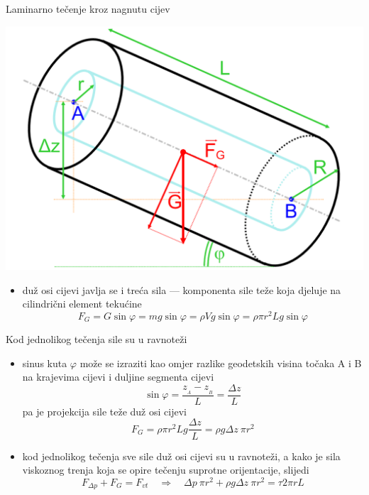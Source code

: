 \documentclass[croatian]{beamer}
\begin{document}
\begin{frame}{Laminarno tečenje kroz nagnutu cijev}

\begin{center}
\includegraphics[width=0.5\paperwidth]{slike/slika2.PNG}
\par\end{center}
\begin{itemize}
\item duž osi cijevi javlja se i treća sila --- komponenta sile teže koja
djeluje na cilindrični element tekućine
\[
F_{G}=G\sin\varphi=mg\sin\varphi=\rho Vg\sin\varphi=\rho\pi r^{2}Lg\sin\varphi
\]
\end{itemize}
\end{frame}

\begin{frame}{Kod jednolikog tečenja sile su u ravnoteži}

\begin{itemize}
\item sinus kuta $\varphi$ može se izraziti kao omjer razlike geodetskih
visina točaka A i B na krajevima cijevi i duljine segmenta cijevi
\[
\sin\varphi=\frac{z_{_{A}}-z_{_{B}}}{L}=\frac{\Delta z}{L}
\]
pa je projekcija sile teže duž osi cijevi
\[
F_{G}=\rho\pi r^{2}Lg\frac{\Delta z}{L}=\rho g\Delta z\:\pi r^{2}
\]
\item kod jednolikog tečenja sve sile duž osi cijevi su u ravnoteži, a kako
je sila viskoznog trenja koja se opire tečenju suprotne orijentacije,
slijedi 
\[
F_{\Delta p}+F_{G}=F_{vt}\quad\Rightarrow\quad\Delta p\:\pi r^{2}+\rho g\Delta z\:\pi r^{2}=\tau2\pi rL
\]
\end{itemize}
\end{frame}
\end{document}

